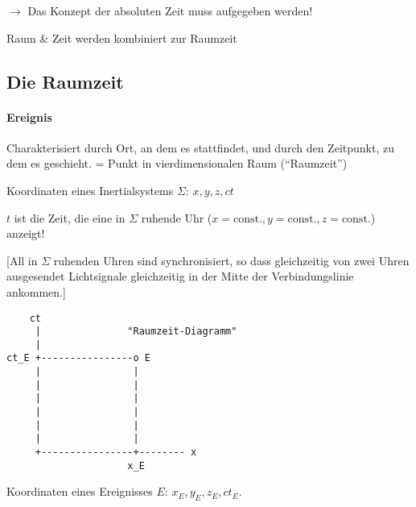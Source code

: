 \documentclass{scrartcl}
\begin{document}
$\rightarrow$ Das Konzept der absoluten Zeit muss aufgegeben werden!

Raum \& Zeit werden kombiniert zur Raumzeit

\subsection{Die Raumzeit}

\paragraph{Ereignis} Charakterisiert durch Ort, an dem es stattfindet,
und durch den Zeitpunkt, zu dem es geschieht. = Punkt in
vierdimensionalen Raum (``Raumzeit'')

Koordinaten eines Inertialsystems $\Sigma$: $x,y,z,ct$

$t$ ist die Zeit, die eine in $\Sigma$ ruhende Uhr
($x=\textrm{const.},y=\textrm{const.},z=\textrm{const.}$) anzeigt!

[All in $\Sigma$ ruhenden Uhren sind synchronisiert, so dass
gleichzeitig von zwei Uhren ausgesendet Lichtsignale gleichzeitig in
der Mitte der Verbindungslinie ankommen.]

\begin{verbatim}
    ct
     |               "Raumzeit-Diagramm"
     |
ct_E +----------------o E
     |                |
     |                |
     |                |
     |                |
     |                |
     |                |
     +----------------+-------- x
                     x_E
\end{verbatim}


Koordinaten eines Ereignisses $E$: $x_E,y_E,z_E,ct_E$.
\end{document}
